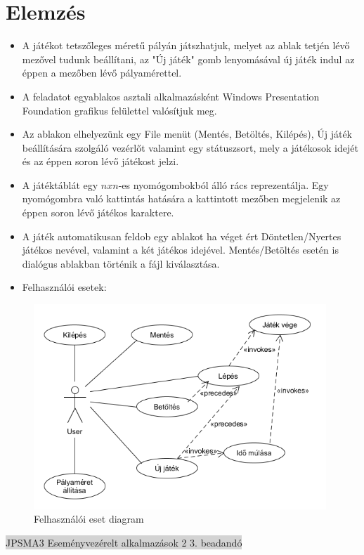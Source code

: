 \documentclass[11pt,a4paper]{article}
\begin{document}
\section{Elemzés}
\begin{itemize}
	\item A játékot tetszőleges méretű pályán játszhatjuk, melyet az ablak tetjén lévő
	mezővel tudunk beállítani, az "Új játék" gomb lenyomásával új játék indul az
	éppen a mezőben lévő pályamérettel.
	\item A feladatot egyablakos asztali alkalmazásként Windows Presentation Foundation grafikus felülettel
	valósítjuk meg.
	\item Az ablakon elhelyezünk egy File menüt (Mentés, Betöltés, Kilépés), Új játék
	beállítására szolgáló vezérlőt valamint egy státuszsort, mely a játékosok idejét és
	az éppen soron lévő játékost jelzi.
	\item A játéktáblát egy $nxn$-es nyomógombokból álló rács reprezentálja. Egy
	nyomógombra való kattintás hatására a kattintott mezőben megjelenik az éppen soron lévő játékos karaktere.
	\item A játék automatikusan feldob egy ablakot ha véget ért Döntetlen/Nyertes játékos
	nevével, valamint a két játékos idejével. Mentés/Betöltés esetén is dialógus ablakban
	történik a fájl kiválasztása.
	\item Felhasználói esetek:
\end{itemize}
\begin{figure}[h]
\centering
\includegraphics[width=11cm]{UMLs/UseCase.png}
\caption{Felhasználói eset diagram}
\end{figure}
\newpage
\thispagestyle{empty}
\begin{center}
\colorbox{lightgray}{{\large JPSMA3} \hspace{3cm} {\large Eseményvezérelt alkalmazások 2 3. beadandó} \hspace{5cm} \thepage}
\end{center}
\end{document}
